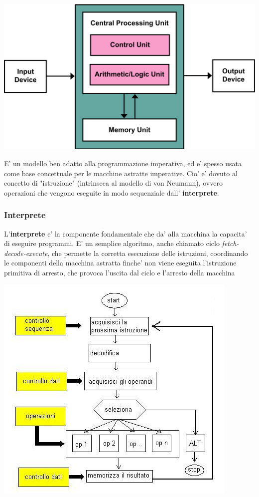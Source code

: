 \begin{center}
  \includegraphics[scale=0.2]{img/vonneumann.png}
\end{center}

E' un modello ben adatto alla programmazione imperativa, ed e' spesso usata come base concettuale per le macchine astratte imperative. Cio' e' dovuto al concetto di "istruzione" (intrinseca al modello di von Neumann), ovvero operazioni che vengono eseguite in modo sequenziale dall' \textbf{interprete}.

\subsubsection{Interprete}
\label{interp}
L'\textbf{interprete} e' la componente fondamentale che da' alla macchina la capacita' di eseguire programmi. E' un semplice algoritmo, anche chiamato ciclo \textit{fetch-decode-execute}, che permette la corretta esecuzione delle istruzioni, coordinando le componenti della macchina astratta finche' non viene eseguita l'istruzione primitiva di arresto, che provoca l'uscita dal ciclo e l'arresto della macchina

\begin{center}
  \includegraphics[scale=0.7]{img/interprete.jpg}
\end{center}

